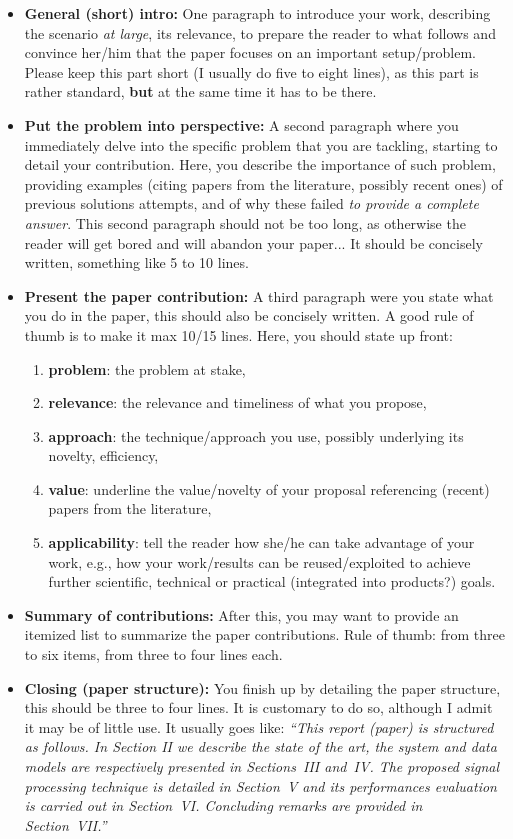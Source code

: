 \begin{itemize}
\item \textbf{General (short) intro:} One paragraph to introduce your work, describing the scenario {\it at large}, its relevance, to prepare the reader to what follows and convince her/him that the paper focuses on an important setup/problem. Please keep this part short (I usually do five to eight lines), as this part is rather standard, \textbf{but} at the same time it has to be there. 
\item \textbf{Put the problem into perspective:} A second paragraph where you immediately delve into the specific problem that you are tackling, starting to detail your contribution. Here, you describe the importance of such problem, providing examples (citing papers from the literature, possibly recent ones) of previous solutions attempts, and of why these failed {\it to provide a complete answer}. This second paragraph should not be too long, as otherwise the reader will get bored and will abandon your paper... It should be concisely written, something like 5 to 10 lines.
\item \textbf{Present the paper contribution:} A third paragraph were you state what you do in the paper, this should also be concisely written. A good rule of thumb is to make it max 10/15 lines. Here, you should state up front:
\begin{enumerate}
\item \textbf{problem}: the problem at stake, 
\item \textbf{relevance}: the relevance and timeliness of what you propose, 
\item \textbf{approach}: the technique/approach you use, possibly underlying its novelty, efficiency, 
\item \textbf{value}: underline the value/novelty of your proposal referencing (recent) papers from the literature,
\item \textbf{applicability}: tell the reader how she/he can take advantage of your work, e.g., how your work/results can be reused/exploited to achieve further scientific, technical or practical (integrated into products?) goals.
\end{enumerate}
\item \textbf{Summary of contributions:} After this, you may want to provide an itemized list to summarize the paper contributions. Rule of thumb: from three to six items, from three to four lines each.
\item \textbf{Closing (paper structure):} You finish up by detailing the paper structure, this should be three to four lines. It is customary to do so, although I admit it may be of little use. It usually goes like: {\it ``This report (paper) is structured as follows. In Section II we describe the state of the art, the system and data models are respectively presented in Sections~III and~IV. The proposed signal processing technique is detailed in Section~V and its performances evaluation is carried out in Section~VI. Concluding remarks are provided in Section~VII.''}
\end{itemize}

